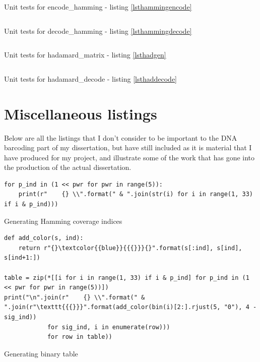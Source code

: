 \documentclass[a4paper,11pt]{article}
\newenvironment{longlisting}
{\addvspace{\baselineskip}\captionsetup{type=listing}}
{\addvspace{\baselineskip}}
\begin{document}
\begin{longlisting}
\inputminted{python}{../src/test_encode_hamming.py}
\caption{Unit tests for encode\_hamming - listing \ref{lsthammingencode}}
\label{lsttesthammingencode}
\end{longlisting}

\begin{longlisting}
\inputminted{python}{../src/test_decode_hamming.py}
\caption{Unit tests for decode\_hamming - listing \ref{lsthammingdecode}}
\label{lsttesthammingdecode}
\end{longlisting}

\begin{longlisting}
\inputminted{python}{../src/test_hadamard_matrix.py}
\caption{Unit tests for hadamard\_matrix - listing \ref{lsthadgen}}
\label{lsttesthadamardmat}
\end{longlisting}

\begin{longlisting}
\inputminted{python}{../src/test_hadamard_decode.py}
\caption{Unit tests for hadamard\_decode - listing \ref{lsthaddecode}}
\label{lsttesthadamarddecode}
\end{longlisting}

    \section{Miscellaneous listings}

    Below are all the listings that I don't consider to be important to the DNA
    barcoding part of my dissertation, but have still included as it is material
    that I have produced for my project, and illustrate some of the work that
    has gone into the production of the actual dissertation.

\begin{longlisting}
\begin{verbatim}
for p_ind in (1 << pwr for pwr in range(5)):
    print(r"    {} \\".format(" & ".join(str(i) for i in range(1, 33) if i & p_ind)))
\end{verbatim}
\caption{Generating Hamming coverage indices}\label{lsthamtab}
\end{longlisting}

\begin{longlisting}
\begin{verbatim}
def add_color(s, ind):
    return r"{}\textcolor{{blue}}{{{}}}{}".format(s[:ind], s[ind], s[ind+1:])

table = zip(*[[i for i in range(1, 33) if i & p_ind] for p_ind in (1 << pwr for pwr in range(5))])
print("\n".join(r"    {} \\".format(" & ".join(r"\texttt{{{}}}".format(add_color(bin(i)[2:].rjust(5, "0"), 4 -sig_ind))
            for sig_ind, i in enumerate(row)))
            for row in table))
\end{verbatim}
\caption{Generating binary table}\label{lsthamcol}
\end{longlisting}
\end{document}
